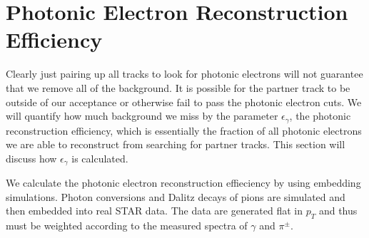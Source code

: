 \section{Photonic Electron Reconstruction Efficiency}

Clearly just pairing up all tracks to look for photonic electrons will not guarantee that we remove all of the background. It is possible for the partner track to be outside of our acceptance or otherwise fail to pass the photonic electron cuts. We will quantify how much background we miss by the parameter $\epsilon_\gamma$, the photonic reconstruction efficiency, which is essentially the fraction of all photonic electrons we are able to reconstruct from searching for partner tracks. This section will discuss how $\epsilon_\gamma$ is calculated.

We calculate the photonic electron reconstruction effieciency by using embedding simulations. Photon conversions and Dalitz decays of pions are simulated and then embedded into real STAR data. The data are generated flat in $p_T$ and thus must be weighted according to the measured spectra of $\gamma$ and $\pi^{\pm}$.
